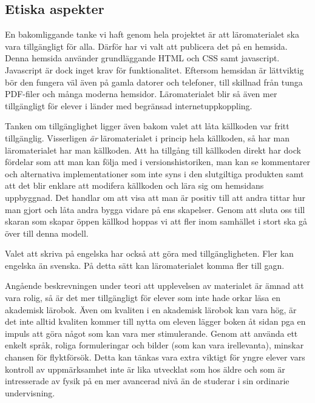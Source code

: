 \begin{draft}

\section{Etiska aspekter}

En bakomliggande tanke vi haft genom hela projektet är att läromaterialet ska
vara tillgängligt för alla. Därför har vi valt att publicera det på en hemsida.
Denna hemsida använder grundläggande HTML och CSS samt javascript. Javascript är
dock inget krav för funktionalitet. Eftersom hemsidan är lättviktig bör den
fungera väl även på gamla datorer och telefoner, till skillnad från tunga
PDF-filer och många moderna hemsidor. Läromaterialet blir så även mer tillgängligt för
elever i länder med begränsad internetuppkoppling.

Tanken om tillgänglighet ligger även bakom valet att låta källkoden var fritt
tillgänglig. Visserligen \textit{är} läromaterialet i princip hela källkoden, så
har man läromaterialet har man källkoden. Att ha tillgång till källkoden direkt har dock
fördelar som att man kan följa med i versionshistoriken, man kan se kommentarer
och alternativa implementationer som inte syns i den slutgiltiga produkten samt
att det blir enklare att modifera källkoden och lära sig om hemsidans uppbyggnad.
Det handlar om att visa att man är positiv till att
andra tittar hur man gjort och låta andra bygga vidare på ens skapelser. Genom
att sluta oss till skaran som skapar öppen källkod hoppas vi att fler inom
samhället i stort ska gå över till denna modell.

Valet att skriva på engelska har också att göra med tillgängligheten. Fler kan
engelska än svenska. På detta sätt kan läromaterialet komma fler till gagn.

Angående beskrevningen under teori att upplevelsen av materialet är ämnad att vara rolig, så
är det mer tillgängligt för elever som inte hade orkar läsa en akademisk lärobok. Även om
kvaliten i en akademisk lärobok kan vara hög, är det inte alltid kvaliten kommer till nytta om
eleven lägger boken åt sidan pga en impuls att göra något som kan vara mer stimulerande.
Genom att använda ett enkelt språk, roliga formuleringar och bilder (som kan vara irellevanta), 
minskar chansen för flyktförsök. Detta kan tänkas vara extra viktigt för yngre elever vars kontroll av
uppmärksamhet inte är lika utvecklat som hos äldre och som är intresserade av fysik på en mer avancerad nivå
än de studerar i sin ordinarie undervisning.

\end{draft}

